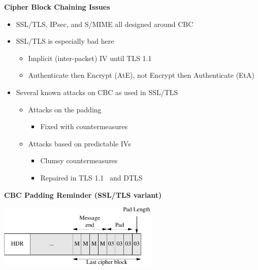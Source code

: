 \documentclass[helvetica]{seminar}
\newcommand{\heading}[1]{%
  \begin{center} 
    \large\bf 
    #1 
  \end{center} 
  \vspace{.4 in}}
\begin{document}
\begin{slide}
\heading{}

\end{slide}



\begin{slide}
\heading{Cipher Block Chaining Issues}

\begin{itemize}
\item SSL/TLS, IPsec, and S/MIME all designed around CBC
\item SSL/TLS is especially bad here 
  \begin{itemize}
  \item Implicit (inter-packet) IV until TLS 1.1
  \item Authenticate then Encrypt (AtE), not Encrypt then Authenticate (EtA)~\cite{krawczyk-encryption-order}
  \end{itemize}
  
\item Several known attacks on CBC as used in SSL/TLS
  \begin{itemize}
  \item Attacks on the padding~\cite{vaudenay-tls-cbc}
    \begin{itemize}
    \item Fixed with countermeasures
    \end{itemize}

\item Attacks based on predictable IVs~\cite{moeller-tls-cbc}
    \begin{itemize}
    \item Clumsy countermeasures
    \item Repaired in TLS 1.1~\cite{rfc4346} and DTLS~\cite{modadugu-rescorla:dtls:ndss2004}
    \end{itemize}
\end{itemize}
  \end{itemize}

\end{slide}



\begin{slide}
\heading{CBC Padding Reminder (SSL/TLS variant)}

\begin{center}
\includegraphics[width=3in]{cbc-pad}

\end{center}
\end{slide}
\end{document}
